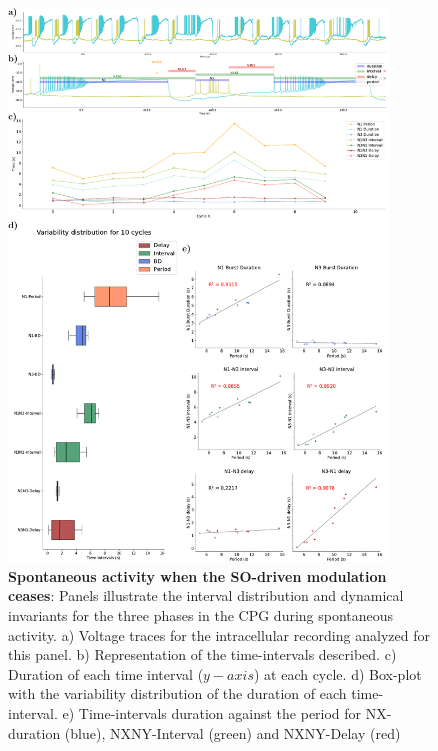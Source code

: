 \begin{figure}[htbp]
	\centering
	\includegraphics[width=0.9\textwidth]{./img/invariants/data/SUSSEX/prep4_so_no_driven/images/panel_with_intervals.pdf}
	\caption{\textbf{Spontaneous activity when the SO-driven modulation ceases}: Panels illustrate the interval distribution and dynamical invariants for the three phases in the CPG during spontaneous activity. a) Voltage traces for the intracellular recording analyzed for this panel. b) Representation of the time-intervals described. c) Duration of each time interval ($y-axis$) at each cycle. d) Box-plot with the variability distribution of the duration of each time-interval. e) Time-intervals duration against the period for NX-duration (blue), NXNY-Interval (green) and NXNY-Delay (red)}
	\label{fig:no so spontaneous invariants}
\end{figure}
 

